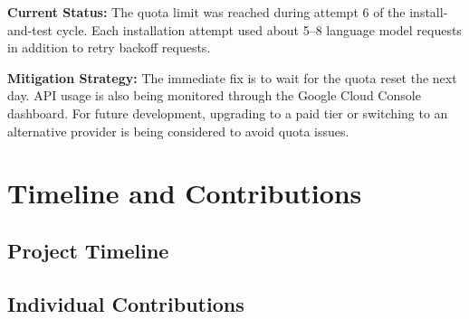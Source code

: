 \documentclass[11pt]{article}
\begin{document}
\textbf{Current Status:} The quota limit was reached during attempt 6 of the install-and-test cycle. Each installation attempt used about 5--8 language model requests in addition to retry backoff requests.

\textbf{Mitigation Strategy:} The immediate fix is to wait for the quota reset the next day. API usage is also being monitored through the Google Cloud Console dashboard. For future development, upgrading to a paid tier or switching to an alternative provider is being considered to avoid quota issues.

\section{Timeline and Contributions}

\subsection{Project Timeline}

\begin{table}[htbp]
  \centering
  \caption{Quant-Bench project timeline and completion status.}
  \label{tab:timeline}
\end{table}

\subsection{Individual Contributions}
\end{document}
